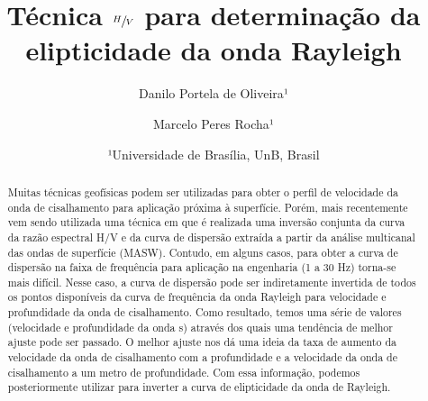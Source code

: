 \documentclass[smallextended]{svjour3}       %
\begin{document}
\title{Técnica $\sfrac{H}{V}$ para determinação da elipticidade da onda Rayleigh}
\subtitle{}


\author{Danilo Portela de Oliveira¹\and Marcelo Peres Rocha¹         
}



\date{¹Universidade de Brasília, UnB, Brasil}


\maketitle


\begin{abstract}


Muitas técnicas geofísicas podem ser utilizadas para obter o perfil de velocidade da onda de cisalhamento para aplicação próxima à superfície. Porém, mais recentemente vem sendo utilizada uma técnica em que é realizada uma inversão conjunta da curva da razão espectral H/V e da curva de dispersão extraída a partir da análise multicanal das ondas de superfície (MASW). Contudo, em alguns casos, para obter a curva de dispersão na faixa de frequência para aplicação na engenharia (1 a 30 Hz) torna-se mais difícil. Nesse caso, a curva de dispersão pode ser indiretamente invertida de todos os pontos disponíveis da curva de frequência da onda Rayleigh para velocidade e profundidade da onda de cisalhamento. Como resultado, temos uma série de valores (velocidade e profundidade da onda s) através dos quais uma tendência de melhor ajuste pode ser passado. O melhor ajuste nos dá uma ideia da taxa de aumento da velocidade da onda de cisalhamento com a profundidade e a velocidade da onda de cisalhamento a um metro de profundidade. Com essa informação, podemos posteriormente utilizar para inverter a curva de elipticidade da onda de Rayleigh.  

\end{abstract}
\end{document}
